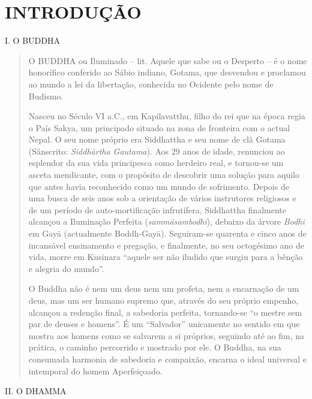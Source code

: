 \chapter{INTRODUÇÃO}

I. O BUDDHA

\begin{quote}
O BUDDHA ou Iluminado -- lit. Aquele que sabe ou o Desperto -- é o nome honorífico conferido ao Sábio indiano, Gotama, que desvendou e proclamou ao mundo a lei da libertação, conhecida no Ocidente pelo nome de Budismo.

Nasceu no Século VI a.C., em Kapilavatthu, filho do rei que na época regia o País Sakya, um principado situado na zona de fronteira com o actual Nepal. O seu nome próprio era Siddhattha e seu nome de clã Gotama (Sânscrito: \emph{Siddhārtha Gautama}). Aos 29 anos de idade, renunciou ao esplendor da sua vida principesca como herdeiro real, e tornou-se um asceta mendicante, com o propósito de descobrir uma solução para aquilo que antes havia reconhecido como um mundo de sofrimento. Depois de uma busca de seis anos sob a orientação de vários instrutores religiosos e de um período de auto-mortificação infrutífera, Siddhattha finalmente alcançou a Iluminação Perfeita (\emph{sammāsambodhi}), debaixo da árvore \emph{Bodhi} em Gayā (actualmente Boddh-Gayā). Seguiram-se quarenta e cinco anos de incansável ensinamento e pregação, e finalmente, no seu octogésimo ano de vida, morre em Kusinara ``aquele ser não iludido que surgiu para a bênção e alegria do mundo''.

O Buddha não é nem um deus nem um profeta, nem a encarnação de um deus, mas um ser humano supremo que, através do seu próprio empenho, alcançou a redenção final, a sabedoria perfeita, tornando-se ``o mestre sem par de deuses e homens''. É um ``Salvador'' unicamente no sentido em que mostra aos homens como se salvarem a si próprios, seguindo até ao fim, na prática, o caminho percorrido e mostrado por ele. O Buddha, na sua consumada harmonia de sabedoria e compaixão, encarna o ideal universal e intemporal do homem Aperfeiçoado.
\end{quote}

II. O DHAMMA

